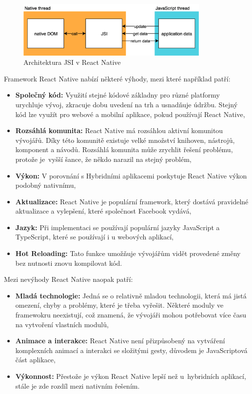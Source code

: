 \documentclass[czech, bc, kiv, he, iso690numb]{fasthesis}
\begin{document}
\begin{figure}[h!]
  \centering
  \includegraphics[width=0.85\textwidth]{img/BP-Runt/Technologies/react-JSI.png}
  \caption{Architektura \gls{JSI} v React Native \cite{react-bridge-figure}}
  \label{fig:react_JSI}
\end{figure}


\noindent Framework React Native nabízí některé výhody, mezi které například patří:

\begin{itemize}
    \item \textbf{Společný kód:} Využití stejné kódové základny pro různé platformy urychluje vývoj, zkracuje dobu uvedení na trh a usnadňuje údržbu. Stejný kód lze využít pro webové a mobilní aplikace, pokud používají React Native,
    \item \textbf{Rozsáhlá komunita:} React Native má rozsáhlou aktivní komunitou vývojářů. Díky této komunitě existuje velké množství knihoven, nástrojů, komponent a návodů. Rozsáhlá komunita může zrychlit řešení problému, protože je~vyšší šance, že někdo narazil na stejný problém,
    \item \textbf{Výkon:} V porovnání s Hybridními aplikacemi poskytuje React Native výkon podobný nativnímu,
    \item \textbf{Aktualizace:} React Native je populární framework, který dostává pravidelné aktualizace a vylepšení, které společnost Facebook vydává, 
    \item \textbf{Jazyk:} Při implementaci se používají populární jazyky JavaScript a TypeScript, které se používají i u webových aplikací,
    \item \textbf{Hot Reloading:} Tato funkce umožňuje vývojářům vidět provedené změny bez nutnosti znovu kompilovat kód.  \cite{what-is-react-native}
\end{itemize}

\noindent Mezi nevýhody React Native naopak patří:

\begin{itemize}
    \item \textbf{Mladá technologie:} Jedná se o relativně mladou technologii, která má jistá omezení, chyby a problémy, které je třeba vyřešit. Některé moduly ve framewokru neexistují, což znamená, že vývojáři mohou potřebovat více času na vytvoření vlastních modulů, 
    \item \textbf{Animace a interakce:} React Native není přizpůsobený na vytváření komplexních animací a interakci se složitými gesty, důvodem je JavaScriptová část aplikace, 
    \item \textbf{Výkonnost:} Přestože je výkon React Native lepší než u~hybridních aplikací, stále je zde rozdíl mezi nativním řešením.
\end{itemize}
\end{document}

